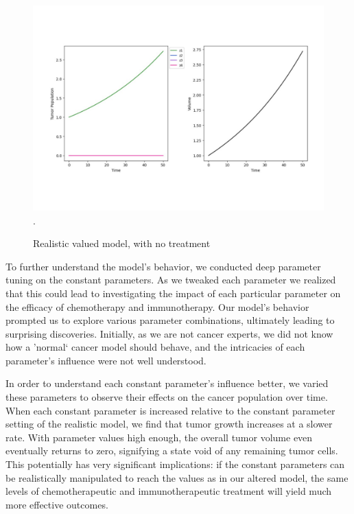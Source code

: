 \documentclass[11pt]{amsart}
\begin{document}
\begin{figure}[h]
\begin{center} %
\includegraphics[width=\textwidth]{parameters_like_paper_no_treatment.pdf}. %
\end{center}
\caption{Realistic valued model, with no treatment}
\label{fig:3}
\end{figure}

To further understand the model's behavior, we conducted deep parameter tuning on the constant parameters. As we tweaked each parameter we realized that this could lead to investigating the impact of each particular parameter on the efficacy of chemotherapy and immunotherapy. Our model's behavior prompted us to explore various parameter combinations, ultimately leading to surprising discoveries. Initially, as we are not cancer experts, we did not know how a 'normal` cancer model should behave, and the intricacies of each parameter's influence were not well understood. 

In order to understand each constant parameter's influence better, we varied these parameters to observe their effects on the cancer population over time. When each constant parameter is increased relative to the constant parameter setting of the realistic model, we find that tumor growth increases at a slower rate. With parameter values high enough, the overall tumor volume even eventually returns to zero, signifying a state void of any remaining tumor cells. This potentially has very significant implications: if the constant parameters can be realistically manipulated to reach the values as in our altered model, the same levels of chemotherapeutic and immunotherapeutic treatment will yield much more effective outcomes. 
\end{document}
